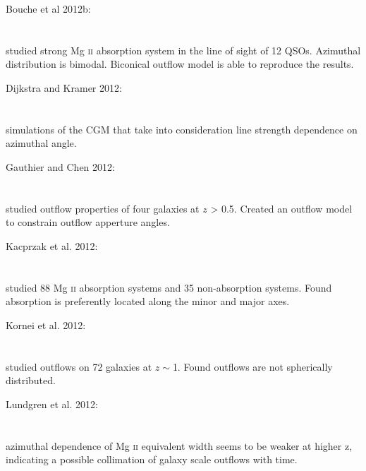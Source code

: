 \hline

Bouche et al 2012b: \\
\citet{2012MNRAS.426..801B} \\
\citep{2012MNRAS.426..801B} \\
studied strong Mg \textsc{ii} absorption system in the line of sight of 12 QSOs.
Azimuthal distribution is bimodal. Biconical outflow model is able to reproduce
the results. \\

\hline

Dijkstra and Kramer 2012: \\
\citet{2012MNRAS.424.1672D} \\
\citep{2012MNRAS.424.1672D} \\
simulations of the CGM that take into consideration line strength dependence on
azimuthal angle. \\

\hline

Gauthier and Chen 2012: \\
\citet{2012MNRAS.424.1952G} \\
\citep{2012MNRAS.424.1952G} \\
studied outflow properties of four galaxies at $z$ > 0.5. Created an outflow
model to constrain outflow apperture angles. \\

\hline

Kacprzak et al. 2012: \\
\citet{2012ApJ...760L...7K} \\
\citep{2012ApJ...760L...7K} \\
studied 88 Mg \textsc{ii} absorption systems and 35 non-absorption systems.
Found absorption is preferently located along the minor and major axes. \\

\hline

Kornei et al. 2012: \\
\citet{2012ApJ...758..135K} \\
\citep{2012ApJ...758..135K} \\
studied outflows on 72 galaxies at $z\sim$1. Found outflows are not spherically
distributed. \\

\hline

Lundgren et al. 2012: \\
\citet{2012ApJ...760...49L} \\
\citep{2012ApJ...760...49L} \\
azimuthal dependence of Mg \textsc{ii} equivalent width seems to be weaker at
higher z, indicating a possible collimation of galaxy scale outflows with time.
\\

